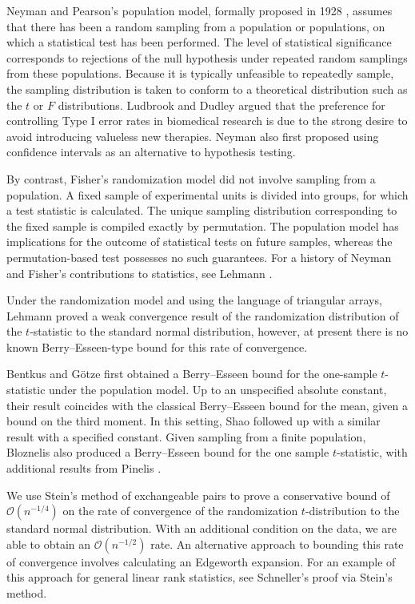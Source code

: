 Neyman and Pearson's population model, formally proposed in 1928
\cite{neyman1928use}, assumes that there has been a random sampling
from a population or populations, on which a statistical test has been
performed.  The level of statistical significance corresponds to
rejections of the null hypothesis under repeated random samplings from
these populations.  Because it is typically unfeasible to repeatedly
sample, the sampling distribution is taken to conform to a theoretical
distribution such as the $t$ or $F$ distributions.  Ludbrook and
Dudley argued that the preference for controlling Type I error rates
in biomedical research is due to the strong desire to avoid introducing
valueless new therapies.  Neyman \cite{neyman1934two} also first proposed
using confidence intervals as an alternative to hypothesis testing.

By contrast, Fisher's randomization model \cite{fisher1935design} did
not involve sampling from a population.  A fixed sample of
experimental units is divided into groups, for which a test statistic
is calculated.  The unique sampling distribution corresponding to the
fixed sample is compiled exactly by permutation.  The population model
has implications for the outcome of statistical tests on future
samples, whereas the permutation-based test possesses no such
guarantees.  For a history of Neyman and Fisher's contributions to
statistics, see Lehmann \cite{MR2798202}.

Under the randomization model and using the language of triangular
arrays, Lehmann \cite{lehmann1999elements} proved a weak convergence
result of the randomization distribution of the $t$-statistic to the
standard normal distribution, however, at present there is no known
Berry--Esseen-type bound for this rate of convergence.

Bentkus and G{\"o}tze \cite{bentkus1996berry} first obtained a
Berry--Esseen bound for the one-sample $t$-statistic under the
population model.  Up to an unspecified absolute constant, their result coincides
with the classical Berry--Esseen bound for the mean, given a bound on
the third moment.  In this setting, Shao \cite{shao2005explicit}
followed up with a similar result with a specified constant.  Given
sampling from a finite population, Bloznelis \cite{bloznelis1999berry}
also produced a Berry--Esseen bound for the one sample $t$-statistic,
with additional results from Pinelis \cite{pinelis2011berry}.

We use Stein's method of exchangeable pairs to prove a conservative
bound of $\mathcal{O}(n^{-1/4})$ on the rate of convergence of the randomization
$t$-distribution to the standard normal distribution.  With an
additional condition on the data, we are able to obtain an
$\mathcal{O}(n^{-1/2})$ rate.  An alternative approach to bounding
this rate of convergence involves calculating an Edgeworth expansion.
For an example of this approach for general linear rank statistics,
see Schneller's \cite{MR1015140} proof via Stein's method.

